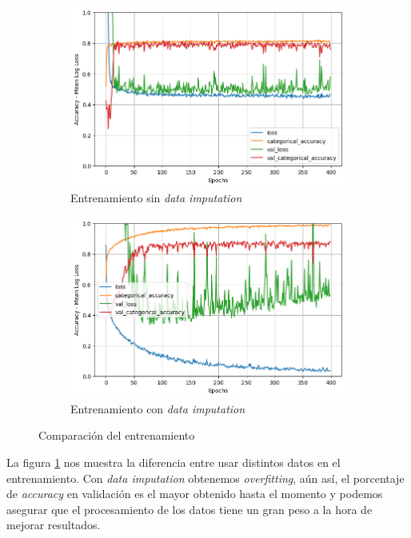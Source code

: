 \documentclass{article}
\begin{document}
			\begin{figure}[!h]
				\centering
     			\begin{subfigure}[b]{0.4\textwidth}
         			\centering
         			\includegraphics[scale=0.3]{d-tr-a3-e4}
         		\caption{Entrenamiento sin \textit{data imputation}}
         		\end{subfigure}
         		\hfill
     			\begin{subfigure}[b]{0.4\textwidth}
       				\centering
         			\includegraphics[scale=0.3]{d-tr-a3-e4-di}
         			\caption{Entrenamiento con \textit{data imputation}}
    		 	\end{subfigure}
    		 	\caption{Comparaci\'on del entrenamiento}
    		 	\label{d-s-tr-dp-2}
			\end{figure}
			La figura \ref{d-s-tr-dp-2} nos muestra la diferencia entre usar distintos datos en el entrenamiento. Con \textit{data imputation} obtenemos \textit{overfitting}, a\'un as\'i, el porcentaje de \textit{accuracy} en validaci\'on es el mayor obtenido hasta el momento y podemos asegurar que el procesamiento de los datos tiene un gran peso a la hora de mejorar resultados.
			
\end{document}
